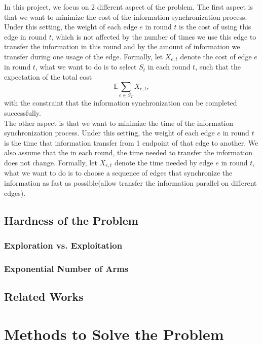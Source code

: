 \documentclass{article}
\theoremstyle{plain}
\theoremstyle{definition}
\theoremstyle{remark}
\begin{document}
    In this project, we focus on 2 different aspect of the problem. The first aspect is that we want to minimize the cost of the information synchronization process. Under this setting, the weight of each edge $e$ in round $t$ is the cost of using this edge in round $t$, which is not affected by the number of times we use this edge to transfer the information in this round and by the amount of information we transfer during one usage of the edge. Formally, let $X_{e,t}$ denote the cost of edge $e$ in round $t$, what we want to do is to select $S_t$ in each round $t$, such that the expectation of the total cost
    \[\mathbb E\sum_{e\in S_T}X_{e,t},\]
    with the constraint that the information synchronization can be completed successfully.\\

    The other aspect is that we want to minimize the time of the information synchronization process. Under this setting, the weight of each edge $e$ in round $t$ is the time that information transfer from $1$ endpoint of that edge to another. We also assume that the in each round, the time needed to transfer the information does not change. Formally, let $X_{e,t}$ denote the time needed by edge $e$ in round $t$, what we want to do is to choose a sequence of edges that synchronize the information as fast as possible(allow transfer the information parallel on different edges).

    \subsection{Hardness of the Problem}
    \subsubsection{Exploration vs. Exploitation}

    \subsubsection{Exponential Number of Arms}

    
    \subsection{Related Works}

    \section{Methods to Solve the Problem}
\end{document}
